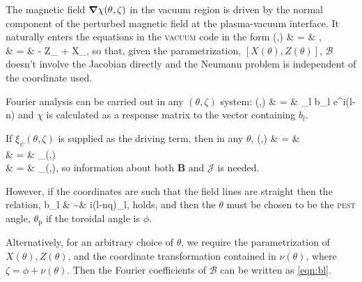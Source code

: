 The magnetic field $\mbox{\boldmath{$\nabla$}}\chi(\theta,\zeta)$ in the vacuum region is
driven by the normal component of the perturbed magnetic field at the
plasma-vacuum interface. It naturally enters the equations in the
\textsc{vacuum} code in the form
%
\beq
{}(\theta,\zeta) & = & \nablav \chi\cdot\nablav{},\\
            & = & - Z_\theta {} +
            X_\theta{},
\eeq
%
so that, given the parametrization, $[X(\theta), Z(\theta)]$,
$\mathcal{B}$ doesn't involve the Jacobian directly and the Neumann
problem is independent of the coordinate used.

Fourier analysis can be carried out in any $(\theta,\zeta)$ system:
%
\beq
{}(\theta,\zeta) & = & \sum_l b_l e^{i(l\theta-n\zeta)} 
\eeq
%
and $\chi$ is calculated as a response matrix to the vector containing
$b_l$.

If $\xi_\psi(\theta,\zeta)$ is supplied as the driving term, then in any
$\theta$,
%
\beq
{}(\theta,\zeta) & = &   \cdot\nablav{} \\
  & = & \cdot\nablav\xi_\psi(\theta,\zeta)\\ & = &
  \cdot\nablav\theta{}\xi_\psi(\theta,\zeta),
\eeq
%
so information about both $\mathbf{B}$ and $\mathcal{J}$ is needed.

However, if the coordinates are such that the field lines are straight
then the relation,
%
\beq 
b_l & \sim & i(l-nq)\xi_l, \label{eqn:bl}
\eeq
%
holds, and then the $\theta$ must be chosen to be the \textsc{pest}
angle, $\theta_\mathrm{p}$ if the toroidal angle is $\phi$.

Alternatively, for an arbitrary choice of $\theta$, we require the
parametrization of $X(\theta), Z(\theta)$, and the coordinate
transformation contained in $\nu(\theta)$, where $\zeta = \phi +
\nu(\theta)$. Then the Fourier coefficients of $\mathcal{B}$ can be
written as \eqref{eqn:bl}.
